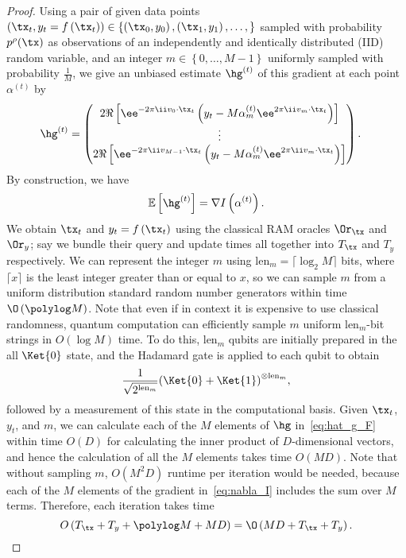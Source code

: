 \begin{proof}
Using a pair of given data points $\left(\tx_t,y_t=f\left(\tx_t\right)\right)\in\left\{\left(\tx_{0},y_{0}\right),\left(\tx_{1},y_{1}\right),\ldots,\right\}$ sampled with probability $p^{\rho}(\tx)$ as observations of an independently and identically distributed (IID) random variable, and an integer $m\in\left\{0,\ldots,M-1\right\}$ uniformly sampled with probability $\frac{1}{M}$, we give an unbiased estimate $\hg^{(t)}$ of this gradient at each point $\alpha^{(t)}$ by
\begin{align}
\label{eq:hat_g_F}
\hg^{(t)}&=
\left(\begin{matrix}2\Re\left[ \ee^{-2\pi\ii v_0\cdot \tx_t}\left(y_t-M\alpha^{(t)}_m\ee^{2\pi\ii v_m\cdot \tx_t}\right)\right]\\
                 \vdots\\
                 2\Re\left[\ee^{-2\pi\ii v_{M-1}\cdot \tx_t}\left(y_t-M\alpha^{(t)}_m\ee^{2\pi\ii v_m\cdot \tx_t}\right)\right]
         \end{matrix}\right).
\end{align}
By construction, we have
\begin{equation}
  \mathbb{E}\left[\hg^{(t)}\right]=\nabla I\left(\alpha^{(t)}\right).
\end{equation}
We obtain $\tx_t$ and $y_t=f\left(\tx_t\right)$ using the classical RAM oracles $\Or_{\tx}$ and $\Or_{y}$; say we bundle their query and update times all together into $T_{\tx}$ and $T_{y}$ respectively.
We can represent the integer $m$ using $\text{len}_m=\lceil\log_2 M \rceil$ bits,
where $\lceil x\rceil$ is the least integer greater than or equal to $x$,
so we can sample $m$ from a uniform distribution standard random number generators within time
$\O\left(\polylog M \right)$.
Note that even if in context it is expensive to use classical randomness, quantum computation can efficiently sample $m$ uniform $\text{len}_m$-bit strings in $O(\log M)$ time.
To do this, $\text{len}_m$ qubits are initially prepared in the all $\Ket{0}$ state, and the Hadamard gate is applied to each qubit to obtain
\begin{equation}
  \frac{1}{\sqrt{2^{\text{len}_m}}}{\left(\Ket{0}+\Ket{1}\right)}^{\otimes \text{len}_m},
\end{equation}
followed by a measurement of this state in the computational basis.
Given $\tx_t$, $y_t$, and $m$, we can calculate each of the $M$ elements of $\hg$ in~\cref{eq:hat_g_F} within time $O(D)$ for calculating the inner product of $D$-dimensional vectors, and hence the calculation of all the $M$ elements takes time $O(MD)$.
Note that without sampling $m$, $O(M^2 D)$ runtime per iteration would be needed, because each of the $M$ elements of the gradient in~\cref{eq:nabla_I} includes the sum over $M$ terms.
Therefore, each iteration takes time
\begin{equation}
  \label{eq:sgd_each_iteration}
  O\left(T_{\tx}+T_y+\polylog M+MD\right)=\O\left(MD+T_{\tx}+T_y\right).
\end{equation}


\end{proof}
